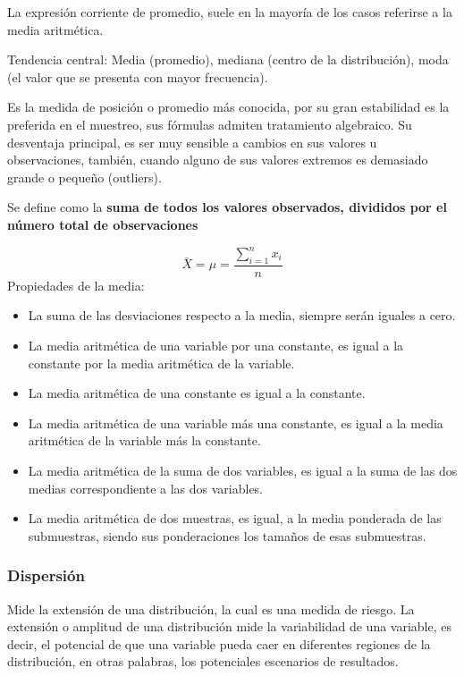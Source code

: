 \documentclass[
]{book}
\providecommand{\tightlist}{%
  \setlength{\itemsep}{0pt}\setlength{\parskip}{0pt}}
\begin{document}
La expresión corriente de promedio, suele en la mayoría de los casos referirse a la media aritmética.

Tendencia central: Media (promedio), mediana (centro de la distribución), moda (el valor que se presenta con mayor frecuencia).

Es la medida de posición o promedio más conocida, por su gran estabilidad es la preferida en el muestreo, sus fórmulas admiten tratamiento algebraico. Su desventaja principal, es ser muy sensible a cambios en sus valores u observaciones, también, cuando alguno de sus valores extremos es demasiado grande o pequeño (outliers).

Se define como la \textbf{suma de todos los valores observados, divididos por el número total de observaciones}

\[\bar{X} = \mu = \frac{\sum_{i=1}^n x_i}{n}\]
Propiedades de la media:

\begin{itemize}
\tightlist
\item
  La suma de las desviaciones respecto a la media, siempre serán iguales a cero.
\item
  La media aritmética de una variable por una constante, es igual a la constante por la media aritmética de la variable.
\item
  La media aritmética de una constante es igual a la constante.
\item
  La media aritmética de una variable más una constante, es igual a la media aritmética de la variable más la constante.
\item
  La media aritmética de la suma de dos variables, es igual a la suma de las dos medias correspondiente a las dos variables.
\item
  La media aritmética de dos muestras, es igual, a la media ponderada de las submuestras, siendo sus ponderaciones los tamaños de esas submuestras.
\end{itemize}

\hypertarget{dispersiuxf3n}{%
\subsubsection{Dispersión}\label{dispersiuxf3n}}

Mide la extensión de una distribución, la cual es una medida de riesgo. La extensión o amplitud de una distribución mide la variabilidad de una variable, es decir, el potencial de que una variable pueda caer en diferentes regiones de la distribución, en otras palabras, los potenciales escenarios de resultados.
\end{document}
